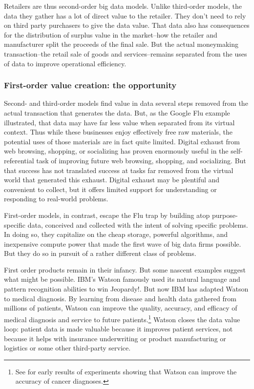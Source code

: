 \documentclass[12pt]{article}
\begin{document}
Retailers are thus second-order big data models. Unlike third-order
models, the data they gather has a lot of direct value to the
retailer. They don't need to rely on third party purchasers to give
the data value. That data also has consequences for the distribution
of surplus value in the market--how the retailer and manufacturer
split the proceeds of the final sale. But the actual moneymaking
transaction--the retail sale of goods and services--remains separated
from the uses of data to improve operational efficiency.

\subsubsection{First-order value creation: the opportunity}
\label{sec:first-order-value}

Second- and third-order models find value in data
several steps removed from the actual transaction that generates the
data. But, as the Google Flu example illustrated, that data may have
far less value when separated from its virtual context. Thus while
these businesses enjoy effectively free raw materials, the potential
uses of those materials are in fact quite limited. Digital exhaust
from web browsing, shopping, or socializing has proven enormously
useful in the self-referential task of improving future web browsing, shopping, and
socializing. But that success has not translated success at tasks far
removed from the virtual world that generated this exhaust. Digital
exhaust may be plentiful and convenient to collect, but it offers
limited support for understanding or responding to real-world problems.

First-order models, in contrast, escape the Flu trap by building atop
purpose-specific data, conceived and collected with the
intent of solving specific problems. In doing so, they capitalize
on the cheap storage, powerful algorithms, and inexpensive compute
power that made the first wave of big data firms possible. But they do
so in pursuit of a rather different class of problems.

First order products remain in their infancy. But some nascent
examples suggest what might be possible. IBM's Watson famously used
its natural language and pattern recognition abilities to win
Jeopardy!. But now IBM has adapted Watson to medical diagnosis. By
learning from disease and health data gathered from millions of
patients, Watson can improve the quality, accuracy, and efficacy of
medical diagnosis and service to future patients.\footnote{See
\cite{wired2013a} for early results of experiments showing that Watson
can improve the accuracy of cancer diagnoses.} Watson closes the data
value loop: patient data is made valuable because it improves patient
services, not because it helps with insurance underwriting or product
manufacturing or logistics or some other third-party service. 
\end{document}
